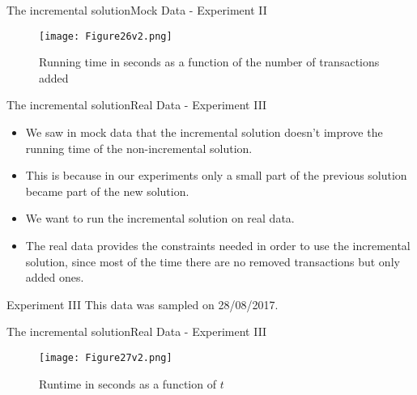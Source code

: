 \documentclass{beamer}
\begin{document}
\begin{frame}{The incremental solution}{Mock Data - Experiment II}
    \begin{figure}
        \centering
        \texttt{[image: Figure26v2.png]}
        \caption{Running time in seconds as a function of the number of 
        transactions added}
    \end{figure}
\end{frame}
\begin{frame}{The incremental solution}{Real Data - Experiment III}
    \begin{itemize}
        \item {We saw in mock data that the incremental solution doesn't 
        improve the running time of the non-incremental solution.}
        \item {This is because in our experiments only a small part of the 
        previous solution became part of the new solution.}
        \item {We want to run the incremental solution on real data.}
        \item {The real data provides the constraints needed in order to use 
        the incremental solution, since most of the time there are no 
        removed transactions but only added ones.}
    \end{itemize}
    \begin{block}{Experiment III}
    This data was sampled on 28/08/2017. 
    \end{block}
\end{frame}

\begin{frame}{The incremental solution}{Real Data - Experiment III}
    \begin{figure}
        \centering
        \texttt{[image: Figure27v2.png]}
        \caption{Runtime in seconds as a function of $t$}
    \end{figure}
\end{frame}
\end{document}
